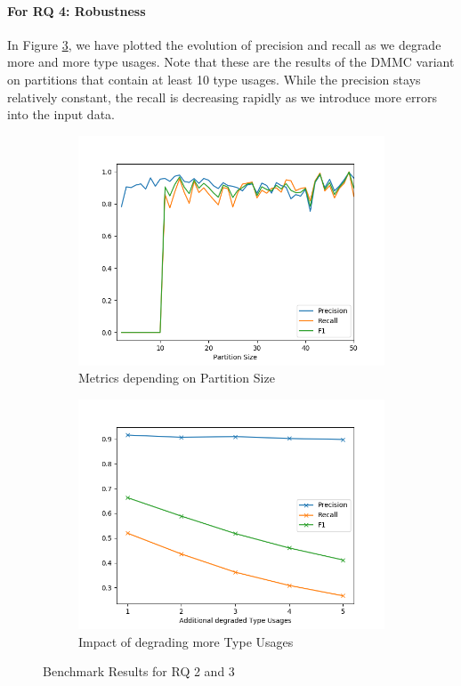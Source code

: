 \paragraph{For RQ 4: Robustness}

In Figure \ref{fig:robustness}, we have plotted the evolution of precision and recall as we degrade more and more type usages.
Note that these are the results of the $\text{DMMC}$ variant on partitions that contain at least 10 type usages.
While the precision stays relatively constant, the recall is decreasing rapidly as we introduce more errors into the input data.

\begin{figure}[t]
    \centering
    \begin{subfigure}[h]{0.49\textwidth}
        \centering
        \includegraphics[width=1.1\textwidth]{figures/graph_partition}
        \caption{Metrics depending on Partition Size}
        \label{fig:partition}
    \end{subfigure}
    \begin{subfigure}[h]{0.49\textwidth}
        \centering
        \includegraphics[width=1.1\textwidth]{figures/graph_robustness}
        \caption{Impact of degrading more Type Usages}
        \label{fig:robustness}
    \end{subfigure}
    \caption{Benchmark Results for RQ 2 and 3}
\end{figure}

